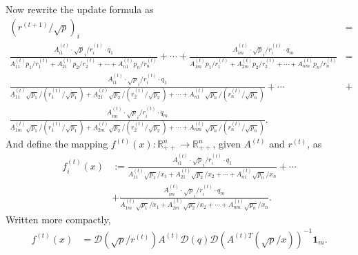 Now rewrite the update formula as 
\begin{align*}
(r^{(t+1)}/\sqrt{p})_{i} & =\\
\frac{A_{i1}^{(t)}\cdot\sqrt{p}_{i}/r_{i}^{(t)}\cdot q_{1}}{A_{11}^{(t)}p_{1}/r_{1}^{(t)}+A_{21}^{(t)}p_{2}/r_{2}^{(t)}+\cdots+A_{n1}^{(t)}p_{n}/r_{n}^{(t)}}+\cdots+\frac{A_{im}^{(t)}\cdot\sqrt{p}_{i}/r_{i}^{(t)}\cdot q_{m}}{A_{1m}^{(t)}p_{1}/r_{1}^{(t)}+A_{2m}^{(t)}p_{2}/r_{2}^{(t)}+\cdots+A_{nm}^{(t)}p_{n}/r_{n}^{(t)}} & =\\
\frac{A_{i1}^{(t)}\cdot\sqrt{p}_{i}/r_{i}^{(t)}\cdot q_{1}}{A_{11}^{(t)}\sqrt{p_{1}}/(r_{1}^{(t)}/\sqrt{p_{1}})+A_{21}^{(t)}\sqrt{p_{2}}/(r_{2}^{(t)}/\sqrt{p_{2}})+\cdots+A_{n1}^{(t)}\sqrt{p_{n}}/(r_{n}^{(t)}/\sqrt{p_{n}})}+\cdots & +\\
\frac{A_{im}^{(t)}\cdot\sqrt{p}_{i}/r_{i}^{(t)}\cdot q_{m}}{A_{1m}^{(t)}\sqrt{p_{1}}/(r_{1}^{(t)}/\sqrt{p_{1}})+A_{2m}^{(t)}\sqrt{p_{2}}/(r_{2}^{(t)}/\sqrt{p_{2}})+\cdots+A_{nm}^{(t)}\sqrt{p_{n}}/(r_{n}^{(t)}/\sqrt{p_{n}})}.
\end{align*}
And define the mapping $f^{(t)}(x):\mathbb{R}_{++}^{n}\rightarrow\mathbb{R}_{++}^{n}$,
given $A^{(t)}$ and $r^{(t)}$, as 
\begin{align*}
f_{i}^{(t)}(x) & :=\frac{A_{i1}^{(t)}\cdot\sqrt{p}_{i}/r_{i}^{(t)}\cdot q_{1}}{A_{11}^{(t)}\sqrt{p_{1}}/x_{1}+A_{21}^{(t)}\sqrt{p_{2}}/x_{2}+\cdots+A_{n1}^{(t)}\sqrt{p_{n}}/x_{n}}+\cdots\\
 & +\frac{A_{im}^{(t)}\cdot\sqrt{p}_{i}/r_{i}^{(t)}\cdot q_{m}}{A_{1m}^{(t)}\sqrt{p_{1}}/x_{1}+A_{2m}^{(t)}\sqrt{p_{2}}/x_{2}+\cdots+A_{nm}^{(t)}\sqrt{p_{n}}/x_{n}}.
\end{align*}
Written more compactly, 
\begin{align*}
f^{(t)}(x) & =\mathcal{D}(\sqrt{p}/r^{(t)})A^{(t)}\mathcal{D}(q)\mathcal{D}(A^{(t)T}(\sqrt{p}/x))^{-1}\mathbf{1}_{m}.
\end{align*}

